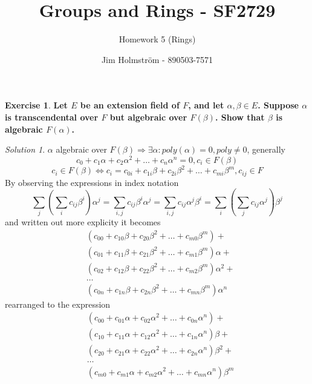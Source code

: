 \documentclass[a4paper,twoside=false,abstract=false,numbers=noenddot,
titlepage=false,headings=small,parskip=half,version=last]{scrartcl}
\author{Jim Holmström - 890503-7571}
\title{Groups and Rings - SF2729}
\subtitle{Homework 5 (Rings)}
\theoremstyle{definition}
\newtheorem{exercise}{Exercise}
\theoremstyle{remark}
\newtheorem*{solution}{Solution}
\newcommand{\poly}[4]{#1_{0#4}+#1_{1#4}{#2}+#1_{2#4}{#2}^2+\dots+#1_{#3#4}{#2}^{#3}}
\newcommand{\polymod}[4]{#1_{{#4}0}+#1_{{#4}1}{#2}+#1_{{#4}2}{#2}^2+\dots+#1_{#4#3}{#2}^{#3}}
\begin{document}
\maketitle
\thispagestyle{empty}

\begin{exercise}
{\bf
    Let $E$ be an extension field of $F$, and let $\alpha,\beta \in E$. Suppose
    $\alpha$ is transcendental over $F$ but algebraic over $F(\beta)$. Show that
    $\beta$ is algebraic $F(\alpha)$.
}
\end{exercise}
\begin{solution}
    $\alpha$ algebraic over $F(\beta) \Rightarrow \exists \alpha :
    poly(\alpha)=0,poly\neq0$, generally
    \begin{equation}
        \poly{c}{\alpha}{n}{}=0,c_i \in F(\beta)
    \end{equation}
    \begin{equation}
        c_i \in F(\beta) \Leftrightarrow c_i=\poly{c}{\beta}{m}{i},c_{ij}\in F
    \end{equation}
    By observing the expressions in index notation
    \begin{equation}
        \sum_j{\left(\sum_i{c_{ij}\beta^i}\right)\alpha^j}=
        \sum_{i,j}{c_{ij}\beta^i\alpha^j}=
        \sum_{i,j}{c_{ij}\alpha^j\beta^i}=
        \sum_i{\left(\sum_j{c_{ij}\alpha^j}\right)\beta^j}
    \end{equation}
    and written out more explicity it becomes
    \begin{equation}
        \begin{split}
            & (\poly{c}{\beta}{m}{0}) + \\
            & (\poly{c}{\beta}{m}{1})\alpha + \\
            & (\poly{c}{\beta}{m}{2})\alpha^2 + \\
            &\dots \\
            & (\poly{c}{\beta}{m}{n})\alpha^n
        \end{split}
    \end{equation}
    rearranged to the expression
    \begin{equation}
        \begin{split}
            & (\polymod{c}{\alpha}{n}{0}) + \\
            & (\polymod{c}{\alpha}{n}{1})\beta + \\
            & (\polymod{c}{\alpha}{n}{2})\beta^2 + \\
            &\dots \\
            & (\polymod{c}{\alpha}{n}{m})\beta^m
        \end{split}
    \end{equation}
    \end{solution}
\end{document}
